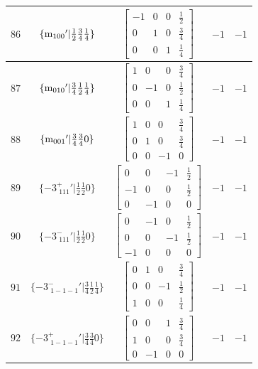 \documentclass[fleqn,8pt]{jsarticle}
\begin{document}
\begin{longtable}{ccccc}
$ 86 $ & $ \{{\rm m}_{100}{}'|\frac{1}{2} \frac{3}{4} \frac{1}{4}\} $ & $ \begin{bmatrix} -1 & 0 & 0 & \frac{1}{2} \\ 0 & 1 & 0 & \frac{3}{4} \\ 0 & 0 & 1 & \frac{1}{4} \end{bmatrix} $ & $ -1 $ & $ -1 $ \\ \hline
$ 87 $ & $ \{{\rm m}_{010}{}'|\frac{3}{4} \frac{1}{2} \frac{1}{4}\} $ & $ \begin{bmatrix} 1 & 0 & 0 & \frac{3}{4} \\ 0 & -1 & 0 & \frac{1}{2} \\ 0 & 0 & 1 & \frac{1}{4} \end{bmatrix} $ & $ -1 $ & $ -1 $ \\ \hline
$ 88 $ & $ \{{\rm m}_{001}{}'|\frac{3}{4} \frac{3}{4} 0\} $ & $ \begin{bmatrix} 1 & 0 & 0 & \frac{3}{4} \\ 0 & 1 & 0 & \frac{3}{4} \\ 0 & 0 & -1 & 0 \end{bmatrix} $ & $ -1 $ & $ -1 $ \\ \hline
$ 89 $ & $ \{-3^{+}_{\,\,111}{}'|\frac{1}{2} \frac{1}{2} 0\} $ & $ \begin{bmatrix} 0 & 0 & -1 & \frac{1}{2} \\ -1 & 0 & 0 & \frac{1}{2} \\ 0 & -1 & 0 & 0 \end{bmatrix} $ & $ -1 $ & $ -1 $ \\ \hline
$ 90 $ & $ \{-3^{-}_{\,\,111}{}'|\frac{1}{2} \frac{1}{2} 0\} $ & $ \begin{bmatrix} 0 & -1 & 0 & \frac{1}{2} \\ 0 & 0 & -1 & \frac{1}{2} \\ -1 & 0 & 0 & 0 \end{bmatrix} $ & $ -1 $ & $ -1 $ \\ \hline
$ 91 $ & $ \{-3^{-}_{\,\,1-1-1}{}'|\frac{3}{4} \frac{1}{2} \frac{1}{4}\} $ & $ \begin{bmatrix} 0 & 1 & 0 & \frac{3}{4} \\ 0 & 0 & -1 & \frac{1}{2} \\ 1 & 0 & 0 & \frac{1}{4} \end{bmatrix} $ & $ -1 $ & $ -1 $ \\ \hline
$ 92 $ & $ \{-3^{+}_{\,\,1-1-1}{}'|\frac{3}{4} \frac{3}{4} 0\} $ & $ \begin{bmatrix} 0 & 0 & 1 & \frac{3}{4} \\ 1 & 0 & 0 & \frac{3}{4} \\ 0 & -1 & 0 & 0 \end{bmatrix} $ & $ -1 $ & $ -1 $ \\ \hline

\end{longtable}
\end{document}
